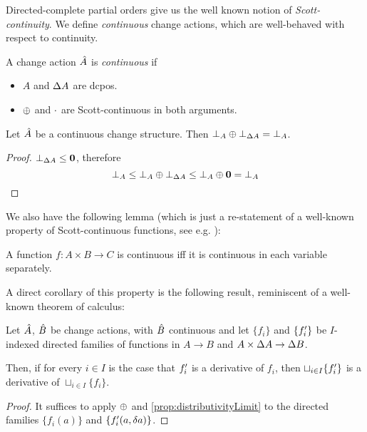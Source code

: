Directed-complete partial orders give us the well known notion of
\emph{Scott-continuity}. We define \emph{continuous} change actions,
which are well-behaved with respect to continuity.

\begin{defn}
  A change action $\hat{A}$ is \emph{continuous} if
  \begin{itemize}
    \item $A$ and $\Delta A$ are dcpos.
    \item $\oplus$ and $\cdot$ are Scott-continuous in both arguments.
  \end{itemize}
\end{defn}

\begin{corollary}
  \label{cor:bottomPlusBottom}
  Let $\hat{A}$ be a continuous change structure. Then $\bot_A \oplus
  \bot_{\Delta A} = \bot_A$.
\end{corollary}
\ifproofs
\begin{proof}
  $\bot_{\Delta A} \leq \textbf{0}$, therefore
  \begin{displaymath}
    \bot_A \leq \bot_A \oplus \bot_{\Delta A} \leq \bot_A \oplus \textbf{0} = \bot_A
  \end{displaymath}
\end{proof}
\fi

We also have the following lemma (which is just a re-statement of a well-known
property of Scott-continuous functions, see e.g. \cite[Lemma~3.2.6]{abramsky1994domain}):

\begin{prop}
  \label{prop:distributivityLimit}
  A function $f : A \times B \rightarrow C$ is continuous iff it is continuous in each variable separately.
\end{prop}

A direct corollary of this property is the following result, reminiscent of a well-known theorem of calculus:

\begin{corollary}
  \label{cor:diffContinuous}
  Let $\hat{A}$, $\hat{B}$ be change actions, with $\hat{B}$ continuous and let $\{f_i\}$ and $\{f_i'\}$ be
  $I$-indexed directed families of functions in $A \rightarrow B$ and $A \times \Delta A \rightarrow \Delta B$.

  Then, if for every $i \in I$ is the case that $f_i'$ is a derivative of $f_i$, then $\sqcup_{i \in I} \{ f_i' \}$ is
  a derivative of $\sqcup_{i \in I} \{ f_i \}$.
\end{corollary}
\ifproofs
\begin{proof}
  It suffices to apply $\oplus$ and \cref{prop:distributivityLimit} to the directed families $\{ f_i(a) \}$ and
  $\{ f_i'(a, \delta a) \}$.
\end{proof}
\fi

